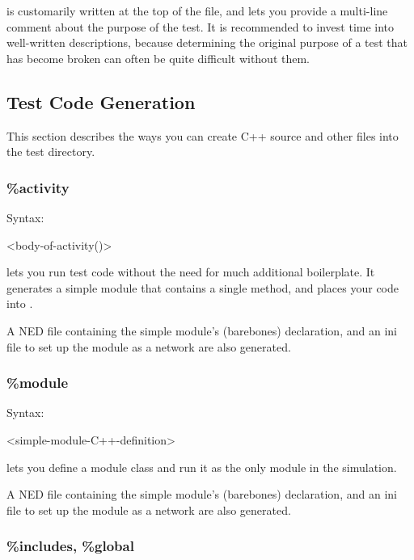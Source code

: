  is customarily written at the top of the 
file, and lets you provide a multi-line comment about the purpose of the
test. It is recommended to invest time into well-written descriptions,
because determining the original purpose of a test that has become broken
can often be quite difficult without them.


\subsection{Test Code Generation}
\label{sec:testing:opptest:test-code-generation}

This section describes the ways you can create C++ source and other files
into the test directory.

\subsubsection{\%activity}
\label{sec:testing:opptest:activity}

Syntax:

\begin{filelisting}
<body-of-activity()>
\end{filelisting}

 lets you run test code without the need for much additional boilerplate.
It generates a simple module that contains a single  method, and places
your code into .

A NED file containing the simple module's (barebones) declaration, and an
ini file to set up the module as a network are also generated.


\subsubsection{\%module}
\label{sec:testing:opptest:module}

Syntax:

\begin{filelisting}
<simple-module-C++-definition>
\end{filelisting}

 lets you define a module class and run it as the only module
in the simulation.

A NED file containing the simple module's (barebones) declaration, and an
ini file to set up the module as a network are also generated.


\subsubsection{\%includes, \%global}
\label{sec:testing:opptest:includes-and-global}

